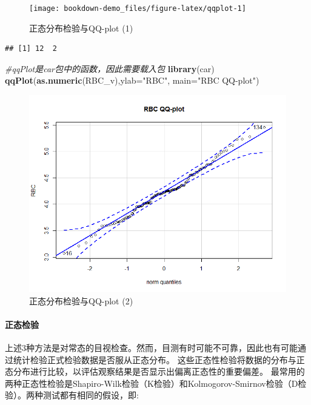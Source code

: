 \documentclass[
]{article}
\newenvironment{Shaded}{\begin{snugshade}}{\end{snugshade}}
\newcommand{\CommentTok}[1]{\textcolor[rgb]{0.56,0.35,0.01}{\textit{#1}}}
\newcommand{\DataTypeTok}[1]{\textcolor[rgb]{0.13,0.29,0.53}{#1}}
\newcommand{\KeywordTok}[1]{\textcolor[rgb]{0.13,0.29,0.53}{\textbf{#1}}}
\newcommand{\NormalTok}[1]{#1}
\newcommand{\StringTok}[1]{\textcolor[rgb]{0.31,0.60,0.02}{#1}}
\begin{document}
\begin{figure}

{\centering \texttt{[image: bookdown-demo\_files/figure-latex/qqplot-1]} 

}

\caption{正态分布检验与QQ-plot (1)}\label{fig:qqplot}
\end{figure}

\begin{verbatim}
## [1] 12  2
\end{verbatim}

\begin{Shaded}
\begin{Highlighting}[]
\CommentTok{#qqPlot是car包中的函数，因此需要载入包}
\KeywordTok{library}\NormalTok{(car)}
\KeywordTok{qqPlot}\NormalTok{(}\KeywordTok{as.numeric}\NormalTok{(RBC_v),}\DataTypeTok{ylab=}\StringTok{"RBC"}\NormalTok{, }\DataTypeTok{main=}\StringTok{"RBC QQ-plot"}\NormalTok{)}
\end{Highlighting}
\end{Shaded}

\begin{figure}

{\centering \includegraphics[width=0.49\linewidth,height=0.49\textheight]{image/qqPlot} 

}

\caption{正态分布检验与QQ-plot (2)}\label{fig:qqplot1}
\end{figure}

\hypertarget{ux6b63ux6001ux68c0ux9a8c}{%
\paragraph{正态检验}\label{ux6b63ux6001ux68c0ux9a8c}}

上述3种方法是对常态的目视检查。然而，目测有时可能不可靠，因此也有可能通过统计检验正式检验数据是否服从正态分布。
这些正态性检验将数据的分布与正态分布进行比较，以评估观察结果是否显示出偏离正态性的重要偏差。
最常用的两种正态性检验是Shapiro-Wilk检验（K检验）和Kolmogorov-Smirnov检验（D检验）。两种测试都有相同的假设，即:
\end{document}
